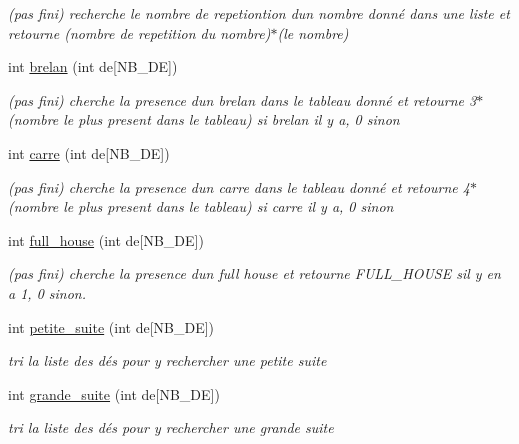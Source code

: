\begin{DoxyCompactItemize}
\begin{DoxyCompactList}\small\item\em (pas fini) recherche le nombre de repetiontion d\textquotesingle{}un nombre donné dans une liste et retourne (nombre de repetition du nombre)$\ast$(le nombre) \end{DoxyCompactList}\item 
int \mbox{\hyperlink{yams___cleo___martin-_colleu__2_80_8c_a3005d90aed29a3c80ba5db99069cfd83}{brelan}} (int de\mbox{[}N\+B\+\_\+\+DE\mbox{]})
\begin{DoxyCompactList}\small\item\em (pas fini) cherche la presence d\textquotesingle{}un brelan dans le tableau donné et retourne 3$\ast$(nombre le plus present dans le tableau) si brelan il y a, 0 sinon \end{DoxyCompactList}\item 
int \mbox{\hyperlink{yams___cleo___martin-_colleu__2_80_8c_ab1e379715ffd22122d1dcb633f7737c5}{carre}} (int de\mbox{[}N\+B\+\_\+\+DE\mbox{]})
\begin{DoxyCompactList}\small\item\em (pas fini) cherche la presence d\textquotesingle{}un carre dans le tableau donné et retourne 4$\ast$(nombre le plus present dans le tableau) si carre il y a, 0 sinon \end{DoxyCompactList}\item 
int \mbox{\hyperlink{yams___cleo___martin-_colleu__2_80_8c_ad33944b5dfb392f102875d134e42188f}{full\+\_\+house}} (int de\mbox{[}N\+B\+\_\+\+DE\mbox{]})
\begin{DoxyCompactList}\small\item\em (pas fini) cherche la presence d\textquotesingle{}un full house et retourne F\+U\+L\+L\+\_\+\+H\+O\+U\+SE s\textquotesingle{}il y en a 1, 0 sinon. \end{DoxyCompactList}\item 
int \mbox{\hyperlink{yams___cleo___martin-_colleu__2_80_8c_a7a5a0a035a8765dfa6098b342b6dfc78}{petite\+\_\+suite}} (int de\mbox{[}N\+B\+\_\+\+DE\mbox{]})
\begin{DoxyCompactList}\small\item\em tri la liste des dés pour y rechercher une petite suite \end{DoxyCompactList}\item 
int \mbox{\hyperlink{yams___cleo___martin-_colleu__2_80_8c_a9a910d2cb5db9b8ad5d270e9a93dcd5f}{grande\+\_\+suite}} (int de\mbox{[}N\+B\+\_\+\+DE\mbox{]})
\begin{DoxyCompactList}\small\item\em tri la liste des dés pour y rechercher une grande suite \end{DoxyCompactList}\item 

\end{DoxyCompactItemize}

